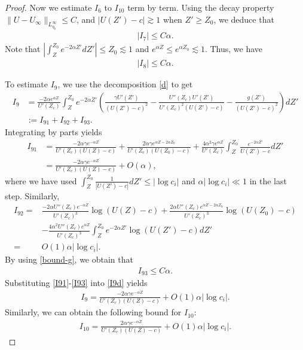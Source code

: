 \documentclass[reqno,11pt]{amsart}
\numberwithin{equation}{section}
\numberwithin{equation}{section}
\theoremstyle{plain}
\begin{document}
\begin{proof}
Now we estimate $I_6$ to $I_{10}$ term by term. Using the decay property $\|U-U_\infty\|_{L^\infty_{\eta_0}}\leq C$, and $|U(Z')-c|\gtrsim 1$ when $Z'\geq Z_0$, we deduce that
\begin{align}\label{I7}
	|I_7|\leq C\alpha.
\end{align}
Note that $|\int_{Z}^{Z_0}e^{-2\alpha Z'} dZ'|\leq Z_0\lesssim 1$ and $e^{\alpha Z}\leq e^{\alpha Z_0}\lesssim 1$. Thus, we have
\begin{align}\label{I8}
	|I_8|\leq C\alpha.
\end{align}

To estimate $I_9$, we use the decomposition \eqref{d} to get
\begin{align}
	I_9&=\frac{-2\alpha e^{\alpha Z}}{U'(Z_c)}\int_Z^{Z_0}e^{-2\alpha Z'}\left( \frac{\gamma U'(Z')}{(U(Z')-c)^2}-\frac{U''(Z_c)U'(Z')}{U'(Z_c)^2(U(Z')-c)}-\frac{g(Z')}{(U(Z')-c)^2}\right) dZ'\nonumber\\
	&:=I_{91}+I_{92}+I_{93}.\label{I9d}
\end{align}
Integrating by parts yields
\begin{align}\label{I91}
	I_{91}&=\frac{-2\alpha\gamma e^{-\alpha Z}}{U'(Z_c)(U(Z)-c)}+\frac{2\alpha\gamma e^{\alpha Z-2\alpha Z_0}}{U'(Z_c)(U(Z_0)-c)}+\frac{4\alpha^2\gamma e^{\alpha Z}}{U'(Z_c)}\int_Z^{Z_0}\frac{e^{-2\alpha Z'}}{U(Z')-c} dZ'\nonumber\\
	&=\frac{-2\alpha\gamma e^{-\alpha Z}}{U'(Z_c)(U(Z)-c)}+O(\alpha),
\end{align}
where we have used $\int_{Z}^{Z_0}\frac{1}{|U(Z')-c|}dZ'\leq |\log c_i|$ and $\alpha |\log c_i|\ll 1$ in the last step. Similarly,
\begin{align}\label{I92}
	I_{92}=&\frac{-2\alpha U''(Z_c) e^{-\alpha Z}}{U'(Z_c)^3}\log (U(Z)-c)+\frac{2\alpha U''(Z_c) e^{\alpha Z-2\alpha Z_0}}{U'(Z_c)^3}\log (U(Z_0)-c)\nonumber\\
	&-\frac{4\alpha^2U''(Z_c)e^{\alpha Z}}{U'(Z_c)^3}\int_{Z}^{Z_0}e^{-2\alpha Z'}\log(U(Z')-c)d Z'\nonumber\\
	=&O(1)\alpha|\log c_i|.
\end{align}
By using \eqref{bound-g}, we obtain that
\begin{align}
	I_{93}\leq C\alpha.\label{I93}
\end{align}
Substituting \eqref{I91}-\eqref{I93} into \eqref{I9d} yields
\begin{align}
	I_9=\frac{-2\alpha\gamma e^{-\alpha Z}}{U'(Z_c)(U(Z)-c)}+O(1)\alpha|\log c_i|.\label{I9}
\end{align}
Similarly, we can obtain the following bound for $I_{10}$:
\begin{align}
	I_{10}=\frac{2\alpha\gamma e^{-\alpha Z}}{U'(Z_c)(U(Z)-c)}+O(1)\alpha|\log c_i|\label{I10}.
\end{align}


\end{proof}
\end{document}
